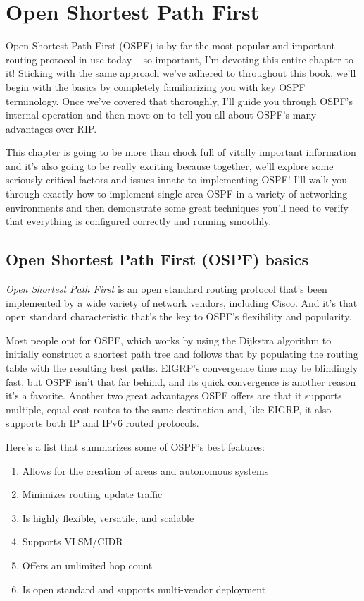 \chapter{Open Shortest Path First}
\label{chap:ospf}

Open Shortest Path First (OSPF) is by far the most popular and important
routing protocol in use today -- so important, I'm devoting this entire
chapter to it! Sticking with the same approach we've adhered to
throughout this book, we'll begin with the basics by completely
familiarizing you with key OSPF terminology. Once we've covered that
thoroughly, I'll guide you through OSPF's internal operation and then
move on to tell you all about OSPF's many advantages over RIP.

This chapter is going to be more than chock full of vitally important
information and it's also going to be really exciting because together,
we'll explore some seriously critical factors and issues innate to
implementing OSPF! I'll walk you through exactly how to implement
single-area OSPF in a variety of networking environments and then
demonstrate some great techniques you'll need to verify that everything
is configured correctly and running smoothly.



\section{Open Shortest Path First (OSPF) basics}

\emph{Open Shortest Path First} is an open standard routing protocol
that's been implemented by a wide variety of network vendors, including
Cisco. And it's that open standard characteristic that's the key to
OSPF's flexibility and popularity.

Most people opt for OSPF, which works by using the Dijkstra algorithm to
initially construct a shortest path tree and follows that by populating
the routing table with the resulting best paths. EIGRP's convergence
time may be blindingly fast, but OSPF isn't that far behind, and its
quick convergence is another reason it's a favorite.
Another two great advantages OSPF offers are that it supports multiple,
equal-cost routes to the same destination and, like EIGRP, it also supports both IP and IPv6 routed protocols.

Here's a list that summarizes some of OSPF's best features:

\begin{enumerate}
\item
  Allows for the creation of areas and autonomous systems
\item
  Minimizes routing update traffic
\item
  Is highly flexible, versatile, and scalable
\item
  Supports VLSM/CIDR
\item
  \protect\hypertarget{c18.xhtmlux5cux23Page_747}{}{}Offers an unlimited
  hop count
\item
  Is open standard and supports multi-vendor deployment
\end{enumerate}

